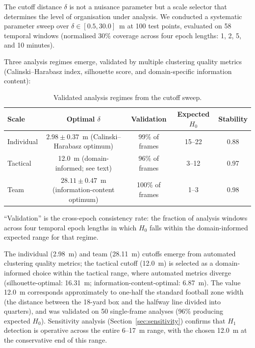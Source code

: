 The cutoff distance \(\delta\) is not a nuisance parameter but a scale selector that determines the level of organisation under analysis. We conducted a systematic parameter sweep over \(\delta\in[0.5,30.0]\)~m at 100 test points, evaluated on 58 temporal windows (normalised 30\% coverage across four epoch lengths: 1, 2, 5, and 10 minutes).

Three analysis regimes emerge, validated by multiple clustering quality metrics (Calinski--Harabasz index, silhouette score, and domain-specific information content):

\begin{table}[H]
  \centering
  \begin{threeparttable}
    \caption{Validated analysis regimes from the cutoff sweep.}
    \label{tab:regimes}
    \begin{tabular}{@{}lcccc@{}}
      \toprule
      Scale & Optimal \(\delta\) & Validation & Expected \(H_0\) & Stability \\
      \midrule
      Individual & \(2.98\pm0.37\)~m (Calinski--Harabasz optimum) & 99\% of frames & 15--22 & 0.88 \\
      Tactical   & 12.0~m (domain-informed; see text)            & 96\% of frames & 3--12  & 0.97 \\
      Team       & \(28.11\pm0.47\)~m (information-content optimum) & 100\% of frames & 1--3 & 0.98 \\
      \bottomrule
    \end{tabular}
    \begin{tablenotes}
      \small
      \item ``Validation'' is the cross-epoch consistency rate: the fraction of analysis windows across four temporal epoch lengths in which \(H_0\) falls within the domain-informed expected range for that regime.
    \end{tablenotes}
  \end{threeparttable}
\end{table}

The individual (2.98~m) and team (28.11~m) cutoffs emerge from automated clustering quality metrics; the tactical cutoff (12.0~m) is selected as a domain-informed choice within the tactical range, where automated metrics diverge (silhouette-optimal: 16.31~m; information-content-optimal: 6.87~m). The value 12.0~m corresponds approximately to one-half the standard football zone width (the distance between the 18-yard box and the halfway line divided into quarters), and was validated on 50 single-frame analyses (96\% producing expected \(H_0\)). Sensitivity analysis (Section~\ref{sec:sensitivity}) confirms that \(H_1\) detection is operative across the entire 6--17~m range, with the chosen 12.0~m at the conservative end of this range.

